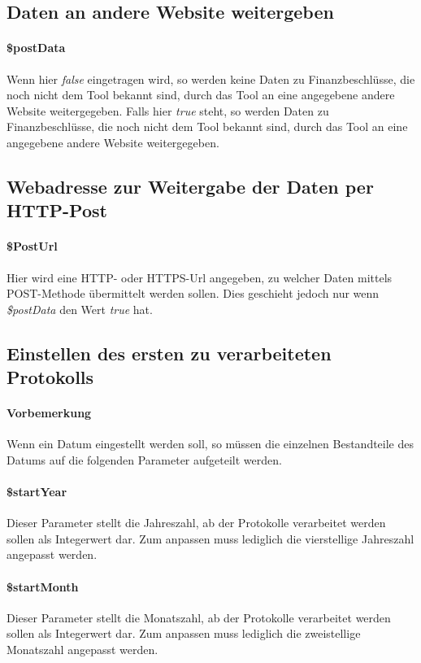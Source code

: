 \documentclass[12pt,parskip=full, pagea4]{scrartcl}
\begin{document}
	\subsection{Daten an andere Website weitergeben}
	\paragraph{\$postData} Wenn hier \textit{false} eingetragen wird, so werden keine Daten zu Finanzbeschlüsse, die noch nicht dem Tool bekannt sind, durch das Tool an eine angegebene andere Website weitergegeben. Falls hier \textit{true} steht, so werden Daten zu Finanzbeschlüsse, die noch nicht dem Tool bekannt sind, durch das Tool an eine angegebene andere Website weitergegeben.
	
	\subsection{Webadresse zur Weitergabe der Daten per HTTP-Post}
	\paragraph{\$PostUrl} Hier wird eine HTTP- oder HTTPS-Url angegeben, zu welcher Daten mittels POST-Methode übermittelt werden sollen. Dies geschieht jedoch nur wenn \textit{\$postData} den Wert \textit{true} hat.
	
	\subsection{Einstellen des ersten zu verarbeiteten Protokolls}
	\paragraph{Vorbemerkung} Wenn ein Datum eingestellt werden soll, so müssen die einzelnen Bestandteile des Datums auf die folgenden Parameter aufgeteilt werden.
	\paragraph{\$startYear} Dieser Parameter stellt die Jahreszahl, ab der Protokolle verarbeitet werden sollen als Integerwert dar. Zum anpassen muss lediglich die vierstellige Jahreszahl angepasst werden.
	\paragraph{\$startMonth} Dieser Parameter stellt die Monatszahl, ab der Protokolle verarbeitet werden sollen als Integerwert dar. Zum anpassen muss lediglich die zweistellige Monatszahl angepasst werden.
\end{document}
